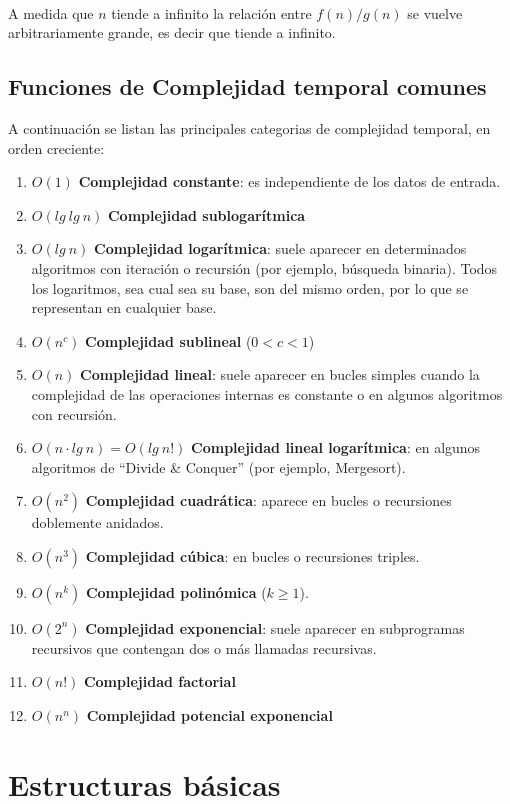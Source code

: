 ~

A medida que $n$ tiende a infinito la relaci\'on entre $f(n)/g(n)$ se vuelve arbitrariamente grande, es decir que tiende a infinito.

\subsection{Funciones de Complejidad temporal comunes}
A continuaci\'on se listan las principales categorias de complejidad temporal, en orden creciente:
\begin{enumerate}
 \item $O(1)$ \textbf{Complejidad constante}: es independiente de los datos de entrada.
 \item $O(lg\ lg\ n)$ \textbf{Complejidad sublogar\'itmica}
 \item $O(lg\ n)$ \textbf{Complejidad logar\'itmica}: suele aparecer en determinados algoritmos con iteraci\'on o recursi\'on (por ejemplo, b\'usqueda binaria). Todos los logaritmos, sea cual sea su base, son del mismo orden, por lo que se representan en cualquier base.
 \item $O(n^c)$ \textbf{Complejidad sublineal} ($0 < c < 1$)
 \item $O(n)$ \textbf{Complejidad lineal}: suele aparecer en bucles simples cuando la complejidad de las operaciones internas es constante o en algunos algoritmos con recursi\'on.
 \item $O(n \cdot lg\ n) = O(lg\ n!)$ \textbf{Complejidad lineal logar\'itmica}: en algunos algoritmos de ``Divide \& Conquer'' (por ejemplo, Mergesort).
 \item $O(n^2)$ \textbf{Complejidad cuadr\'atica}: aparece en bucles o recursiones doblemente anidados.
 \item $O(n^3)$ \textbf{Complejidad c\'ubica}: en bucles o recursiones triples.
 \item $O(n^k)$ \textbf{Complejidad polin\'omica} ($k \geq 1$).
 \item $O(2^n)$ \textbf{Complejidad exponencial}: suele aparecer en subprogramas recursivos que contengan dos o m\'as llamadas recursivas.
 \item $O(n!)$ \textbf{Complejidad factorial}
 \item $O(n^n)$ \textbf{Complejidad potencial exponencial}
\end{enumerate}

\newpage
\section{Estructuras b\'asicas}
